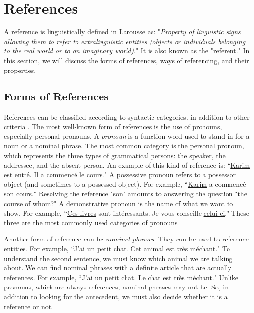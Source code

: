 \documentclass{KBook}
\begin{document}
\section{References}

A reference is linguistically defined in Larousse as: "\textit{Property of linguistic signs allowing them to refer to extralinguistic entities (objects or individuals belonging to the real world or to an imaginary world)}." It is also known as the "referent." In this section, we will discuss the forms of references, ways of referencing, and their properties.


\subsection{Forms of References}

References can be classified according to syntactic categories, in addition to other criteria \cite{2015-schmolz}. The most well-known form of references is the use of pronouns, especially personal pronouns. A \textit{pronoun} is a function word used to stand in for a noun or a nominal phrase. The most common category is the personal pronoun, which represents the three types of grammatical persons: the speaker, the addressee, and the absent person. An example of this kind of reference is: ``\underline{Karim} est entré. \underline{Il} a commencé le cours." A possessive pronoun refers to a possessor object (and sometimes to a possessed object). For example, ``\underline{Karim} a commencé \underline{son} cours." Resolving the reference "son" amounts to answering the question "the course of whom?" A demonstrative pronoun is the name of what we want to show. For example, ``\underline{Ces livres} sont intéressants. Je vous conseille \underline{celui-ci}." These three are the most commonly used categories of pronouns.

Another form of reference can be \textit{nominal phrases}. They can be used to reference entities. For example, ``J'ai un petit \underline{chat}. \underline{Cet animal} est très méchant." To understand the second sentence, we must know which animal we are talking about. We can find nominal phrases with a definite article that are actually references. For example, ``J'ai un petit \underline{chat}. \underline{Le chat} est très méchant." Unlike pronouns, which are always references, nominal phrases may not be. So, in addition to looking for the antecedent, we must also decide whether it is a reference or not.
\end{document}
